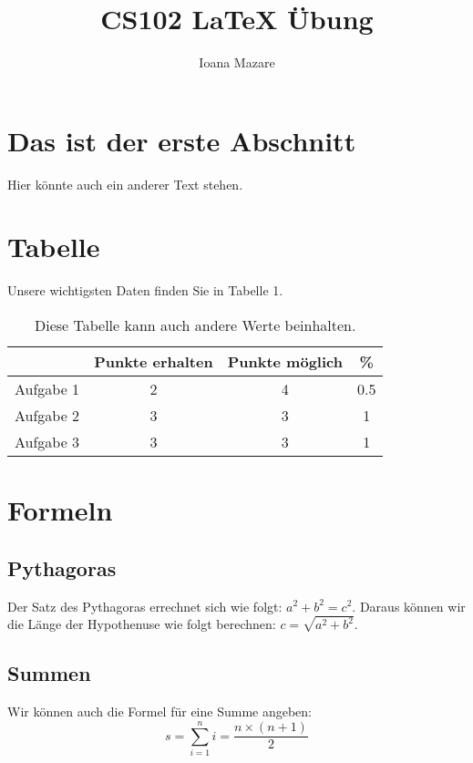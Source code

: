 \documentclass[11pt,a4paper]{article}
\begin{document}
\title{CS102 \LaTeX \hspace{1pt} \"Ubung}
\author{Ioana Mazare}
\maketitle

\section{Das ist der erste Abschnitt}
Hier k\"onnte auch ein anderer Text stehen.

\section{Tabelle}
Unsere wichtigsten Daten finden Sie in Tabelle 1.
\begin{table}[h]
\centering
\begin{tabular}{c|c|c|c}
 & Punkte erhalten & Punkte m\"oglich & \% \\
\hline
Aufgabe 1 & 2 & 4 & 0.5 \\
Aufgabe 2 & 3 & 3 & 1 \\
Aufgabe 3 & 3 & 3 & 1 \\
\end{tabular}
\caption{Diese Tabelle kann auch andere Werte beinhalten.}
\end{table}

\section{Formeln}
\subsection{Pythagoras}
Der Satz des Pythagoras errechnet sich wie folgt: $a^{2}+b^{2}=c^{2}$.
Daraus k\"onnen wir die L\"ange der Hypothenuse wie folgt berechnen: $c=\sqrt{a^{2}+b^{2}}$.

\subsection{Summen}
Wir k\"onnen auch die Formel f\"ur eine Summe angeben:
\begin{equation}
s=\sum_{i=1}^{n} i=\frac{n\times(n+1)}{2}
\end{equation}
\end{document}
